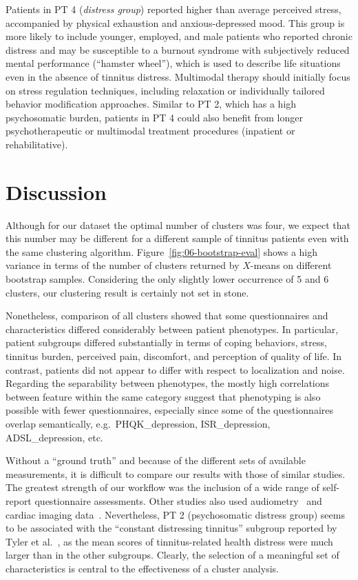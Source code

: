\documentclass[
  oneside]{book}
\begin{document}
Patients in PT 4 (\emph{distress group}) reported higher than average perceived stress, accompanied by physical exhaustion and anxious-depressed mood.
This group is more likely to include younger, employed, and male patients who reported chronic distress and may be susceptible to a burnout syndrome with subjectively reduced mental performance (``hamster wheel''), which is used to describe life situations even in the absence of tinnitus distress.
Multimodal therapy should initially focus on stress regulation techniques, including relaxation or individually tailored behavior modification approaches.
Similar to PT 2, which has a high psychosomatic burden, patients in PT 4 could also benefit from longer psychotherapeutic or multimodal treatment procedures (inpatient or rehabilitative).

\hypertarget{phenotypes-discussion}{%
\section{Discussion}\label{phenotypes-discussion}}

Although for our dataset the optimal number of clusters was four, we expect that this number may be different for a different sample of tinnitus patients even with the same clustering algorithm.
Figure~\ref{fig:06-bootstrap-eval} shows a high variance in terms of the number of clusters returned by \(X\)-means on different bootstrap samples.
Considering the only slightly lower occurrence of 5 and 6 clusters, our clustering result is certainly not set in stone.

Nonetheless, comparison of all clusters showed that some questionnaires and characteristics differed considerably between patient phenotypes.
In particular, patient subgroups differed substantially in terms of coping behaviors, stress, tinnitus burden, perceived pain, discomfort, and perception of quality of life.
In contrast, patients did not appear to differ with respect to localization and noise.
Regarding the separability between phenotypes, the mostly high correlations between feature within the same category suggest that phenotyping is also possible with fewer questionnaires, especially since some of the questionnaires overlap semantically, e.g.~PHQK\_depression, ISR\_depression, ADSL\_depression, etc.

Without a ``ground truth'' and because of the different sets of available measurements, it is difficult to compare our results with those of similar studies.
The greatest strength of our workflow was the inclusion of a wide range of self-report questionnaire assessments.
Other studies also used audiometry~\autocite{Tyler:TinnitusClustering2008,Langguth:LCA2017} and cardiac imaging data~\autocite{Schecklmann:BrainResearch2012}.
Nevertheless, PT 2 (psychosomatic distress group) seems to be associated with the ``constant distressing tinnitus'' subgroup reported by Tyler et al.~\autocite{Tyler:TinnitusClustering2008}, as the mean scores of tinnitus-related health distress were much larger than in the other subgroups.
Clearly, the selection of a meaningful set of characteristics is central to the effectiveness of a cluster analysis.
\end{document}

